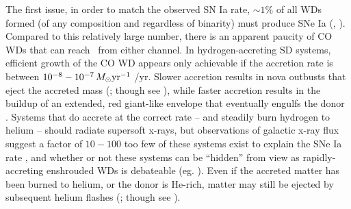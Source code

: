 The first issue, in order to match the observed SN Ia rate, $\sim1$\% of all WDs formed (of any composition and regardless of binarity) must produce SNe Ia (\citeal{vkercj10}, \citealt{vker13}).  Compared to this relatively large number, there is an apparent paucity of CO WDs that can reach \Mch\ from either channel.  In hydrogen-accreting SD systems, efficient growth of the CO WD appears only achievable if the accretion rate is between $10^{-8} - 10^{-7}\,\Msun\pyr$ {\Msun}/yr.  Slower accretion results in nova outbusts that eject the accreted mass (\citealt{townsb04}; though see \citealt{zorosg11}), while faster accretion results in the buildup of an extended, red giant-like envelope that eventually engulfs the donor \citep{ibent84}.  Systems that do accrete at the correct rate -- and steadily burn hydrogen to helium -- should radiate supersoft x-rays, but observations of galactic x-ray flux suggest a factor of $10 - 100$ too few of these systems exist to explain the SNe Ia rate \citep{dste10, gilfb10}, and whether or not these systems can be ``hidden'' from view as rapidly-accreting enshrouded WDs is debateable (eg. \citealt{hachkn10, joha+14}).  Even if the accreted matter has been burned to helium, or the donor is He-rich, matter may still be ejected by subsequent helium flashes (\citealt{idanss13}; though see \citealt{hill+16}).

